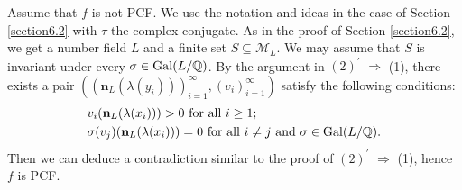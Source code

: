\documentclass[12pt]{amsart}
\theoremstyle{plain}
\theoremstyle{remark}
\theoremstyle{definition}
\def\Q{\mathbb Q}
\begin{document}
Assume that $f$ is not PCF. We use the notation and ideas in the case of Section \ref{section6.2} with $\tau$ the complex conjugate. As in the proof of Section \ref{section6.2}, we get a number field $L$ and a finite set $S\subseteq\mathcal{M}_L$. We may assume that $S$ is invariant under every $\sigma\in{\rm Gal}(L/\Q)$. By the argument in $(2)^\prime$ $\Rightarrow$ (1), there exists a pair  $((\mathbf{n}_{L}(\lambda(y_{i})))_{i=1}^\infty,(v_{i})_{i=1}^\infty)$ satisfy the following conditions:\begin{align*}&v_i(\mathbf{n}_L(\lambda(x_i)))>0\text{ for all }i\geq1;\\
	&\sigma(v_j)(\mathbf{n}_L(\lambda(x_i)))=0\text{ for all }i\neq j\text{ and }\sigma\in{\rm Gal}(L/\Q).
\end{align*} Then we can deduce a contradiction similar to the proof of $(2)^\prime$ $\Rightarrow$ (1), hence $f$ is PCF.



\end{document}
